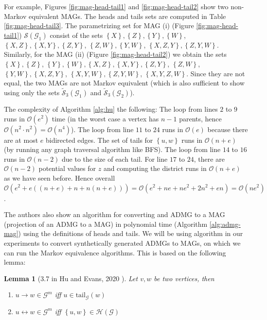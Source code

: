 \documentclass[a4paper]{article}
\newtheorem{lemma}{Lemma}
\begin{document}
For example, Figures \ref{fig:mag-head-tail1} and \ref{fig:mag-head-tail2} show two non-Markov equivalent MAGs. The heads and tails sets are computed in Table \ref{fig:mag-head-tail3}. The parametrizing set for MAG (i) (Figure \ref{fig:mag-head-tail1}) $\mathcal{S}(\mathcal{G}_1)$ consist of the sets $\left\{ X \right\}, \left\{ Z\right\}, \left\{ Y\right\}, \left\{ W\right\}$, $\left\{ X,Z \right\}, \left\{ X, Y\right\}, \left\{ Z, Y\right\}$, $\left\{ Z,W \right\}, \left\{ Y, W\right\}$, $\left\{ X,Z,Y \right\}, \left\{ Z,Y,W\right\}$. Similarly, for the MAG (ii) (Figure \ref{fig:mag-head-tail2}) we obtain the sets $\left\{ X \right\}, \left\{ Z\right\}$, $\left\{ Y\right\}, \left\{ W\right\}, \left\{ X,Z \right\}, \left\{ X, Y\right\}, \left\{ Z, Y\right\}$, $\left\{ Z,W \right\}$, $\left\{ Y, W\right\}, \left\{ X,Z,Y \right\}$, $\left\{ X,Y,W\right\}, \left\{ Z,Y,W\right\}$, $\left\{X,Y,Z,W \right\}$. Since they are not equal, the two MAGs are not Markov equivalent (which is also sufficient to show using only the sets $\mathcal{\tilde{S}}_3(\mathcal{G}_1)$ and $\mathcal{\tilde{S}}_3(\mathcal{G}_2)$).

The complexity of Algorithm \ref{alg:hu} the following: The loop from lines $2$ to $9$ runs in $\mathcal{O}(e^2)$ time (in the worst case a vertex has $n-1$ parents, hence $\mathcal{O}(n^2 \cdot n^2) = \mathcal{O}(n^4)$). The loop from line $11$ to $24$ runs in $\mathcal{O}(e)$ because there are at most $e$ bidirected edges. The set of tails for $\left\{u,w\right\}$ runs in $\mathcal{O}(n+e)$ (by running any graph traversal algorithm like BFS). The loop from line $14$ to $16$ runs in $\mathcal{O}(n-2)$ due to the size of each tail. For line $17$ to $24$, there are $\mathcal{O}(n-2)$ potential values for $z$ and computing the district runs in $\mathcal{O}(n+e)$ as we have seen before. Hence overall $\mathcal{O}(e^2 + e((n+e) + n + n(n+e))) = \mathcal{O}(e^2 + ne + ne^2 + 2n^2 + en) = \mathcal{O}(n e^2)$.

The authors also show an algorithm for converting and ADMG to a MAG (projection of an ADMG to a MAG) in polynomial time (Algorithm \ref{alg:admg-mag}) using the definitions of heads and tails. We will be using algorithm in our experiments to convert synthetically generated ADMGs to MAGs, on which we can run the Markov equivalence algorithms. This is based on the following lemma:

\begin{lemma}[3.7 in Hu and Evans, 2020 \cite{hu2020}]
	Let $v,w$ be two vertices, then 
	\begin{enumerate}
		\item $u \rightarrow w \in \mathcal{G}^m$ iff $u \in \text{tail}_{\mathcal{G}}(w)$
		\item $u \leftrightarrow w \in \mathcal{G}^m$ iff $\left\{ u, w\right\} \in \mathcal{H}(\mathcal{G})$
	\end{enumerate}
\end{lemma}
\end{document}
